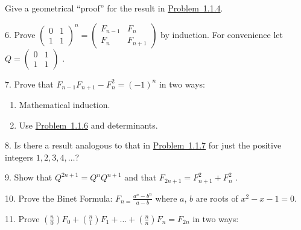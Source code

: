 \documentclass[10pt,]{book}
\theoremstyle{plain}
\theoremstyle{definition}
\theoremstyle{definition}
\numberwithin{equation}{chapter}
\newcommand{\amp}{&}
\begin{document}
\begin{exerciselist}
Give a geometrical ``proof'' for the result in \hyperlink{fib-sum-squares}{Problem~1.1.4}.%
\par\smallskip
\item[6.]\hypertarget{fib-matrix}{}\hypertarget{p-29}{}%
Prove \(\begin{pmatrix}
0 \amp 1\\
1 \amp 1
\end{pmatrix}^{n} = \begin{pmatrix}
F_{n - 1} \amp F_{n}\\
F_{n} \amp F_{n + 1}
\end{pmatrix}\) by induction. For convenience let \(Q =\begin{pmatrix}
0 \amp 1 \\
1 \amp 1
\end{pmatrix}\) .%
\par\smallskip
\item[7.]\hypertarget{fib-neg-one}{}\hypertarget{p-30}{}%
Prove that \(F_{n - 1}F_{n + 1} - F_{n}^{2} = (-1)^{n}\) in two ways:%
\leavevmode%
\begin{enumerate}[label=(\alph*)]
\item\hypertarget{li-7}{}\hypertarget{p-31}{}%
Mathematical induction.%
\item\hypertarget{li-8}{}\hypertarget{p-32}{}%
Use \hyperlink{fib-matrix}{Problem~1.1.6} and determinants.%
\end{enumerate}
\par\smallskip
\item[8.]\hypertarget{exercise-8}{}\hypertarget{p-33}{}%
Is there a result analogous to that in \hyperlink{fib-neg-one}{Problem~1.1.7} for just the positive integers \(1, 2, 3, 4, \ldots\)?%
\par\smallskip
\item[9.]\hypertarget{exercise-9}{}\hypertarget{p-34}{}%
Show that \(Q^{2n + 1} = Q^{n}Q^{n+1}\) and that \(F_{2n + 1} = F_{n + 1}^{2} + F_{n}^{2}\) .%
\par\smallskip
\item[10.]\hypertarget{exercise-10}{}\hypertarget{p-35}{}%
Prove the Binet Formula: \(F_{n = }\frac{a^{n} - b^{n}}{a - b}\) where \(a\), \(b\) are roots of \(x^{2} - x - 1 = 0\).%
\par\smallskip
\item[11.]\hypertarget{exercise-11}{}\hypertarget{p-36}{}%
Prove \(\left( \frac{n}{0} \right)F_{0} + \left( \frac{n}{1} \right)F_{1} + \ldots + \left( \frac{n}{n} \right)F_{n} = F_{2n}\) in two ways:%
\leavevmode%
\begin{enumerate}[label=(\alph*)]

\end{enumerate}
\end{exerciselist}
\end{document}
